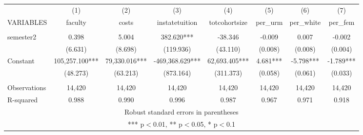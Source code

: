 \documentclass[]{article}
\begin{document}
\begin{tabular}{lccccccc} \hline
 & (1) & (2) & (3) & (4) & (5) & (6) & (7) \\
VARIABLES & faculty & costs & instatetuition & totcohortsize & per\_urm & per\_white & per\_fem \\ \hline
 &  &  &  &  &  &  &  \\
semester2 & 0.398 & 5.004 & 382.620*** & -38.346 & -0.009 & 0.007 & -0.002 \\
 & (6.631) & (8.698) & (119.936) & (43.110) & (0.008) & (0.008) & (0.004) \\
Constant & 105,257.100*** & 79,330.016*** & -469,368.629*** & 62,693.405*** & 4.681*** & -5.798*** & -1.789*** \\
 & (48.273) & (63.213) & (873.164) & (311.373) & (0.058) & (0.061) & (0.033) \\
 &  &  &  &  &  &  &  \\
Observations & 14,420 & 14,420 & 14,420 & 14,420 & 14,420 & 14,420 & 14,420 \\
 R-squared & 0.988 & 0.990 & 0.996 & 0.987 & 0.967 & 0.971 & 0.918 \\ \hline
\multicolumn{8}{c}{ Robust standard errors in parentheses} \\
\multicolumn{8}{c}{ *** p$<$0.01, ** p$<$0.05, * p$<$0.1} \\
\end{tabular}
\end{document}
